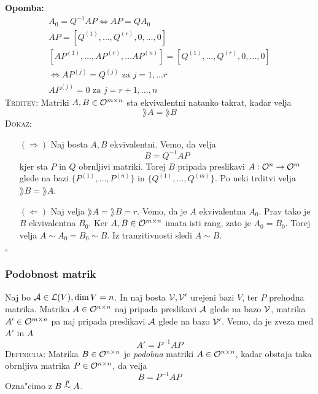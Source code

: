 \textbf{Opomba:} 
\begin{gather*}
A_0 = Q^{-1}AP \iff AP = Q A_0 \\
AP = [Q^{(1)}, \ldots, Q^{(r)}, 0, \ldots, 0] \\
[AP^{(1)}, \ldots, AP^{(r)}, \ldots AP^{(n)}] = [Q^{(1)}, \ldots, Q^{(r)}, 0, \ldots, 0] \\
\iff AP^{(j)} = Q^{(j)} \text{ za } j = 1, \ldots r \\
AP^{(j)} = 0 \text{ za } j = r+1, \ldots, n
\end{gather*}
%
\textsc{Trditev:} Matriki $A, B \in \mathcal{O}^{m \times n}$ sta ekvivalentni natanko takrat, kadar velja
\begin{equation*}
\rang A = \rang B
\end{equation*}
\textsc{Dokaz:}
\begin{itemize}
	\item[$(\Rightarrow)$] Naj bosta $A, B$ ekvivalentni. Vemo, da velja
	\begin{equation*}
	B = Q^{-1}AP
	\end{equation*}
	kjer sta $P$ in $Q$ obrnljivi matriki. Torej $B$ pripada preslikavi $A: \mathcal{O}^n \to \mathcal{O}^m$ glede na bazi $\{P^{(1)}, \ldots, P^{(n)}\}$ in $\{Q^{(1)}, \ldots, Q^{(m)}\}$. Po neki trditvi velja $\rang B = \rang A$.
	
	\item[$(\Leftarrow)$] Naj velja $\rang A = \rang B = r$. Vemo, da je $A$ ekvivalentna $A_0$. Prav tako je $B$ ekvivalentna $B_0$. Ker $A, B \in \mathcal{O}^{m \times n}$ imata isti rang, zato je $A_0 = B_0$. Torej velja $A \sim A_0 = B_0 \sim B$. Iz tranzitivnosti sledi $A \sim B$.
\end{itemize}
\hfill $\square$
%
\subsubsection{Podobnost matrik}
Naj bo $\mathcal{A} \in \mathcal{L}(V), \dim V = n$. In naj bosta $\mathcal{V}, \mathcal{V}'$ urejeni bazi $V$, ter $P$ prehodna matrika. Matrika $A \in \mathcal{O}^{n \times n}$ naj pripada preslikavi $\mathcal{A}$ glede na bazo $\mathcal{V}$, matrika $A' \in \mathcal{O}^{m \times n}$ pa naj pripada preslikavi $\mathcal{A}$ glede na bazo $\mathcal{V}'$. Vemo, da je zveza med $A'$ in $A$
\begin{equation*}
A' = P^{-1}AP
\end{equation*}
%
\textsc{Definicija:} Matrika $B \in \mathcal{O}^{n \times n}$ je \emph{podobna} matriki $A \in \mathcal{O}^{n \times n}$, kadar obstaja taka obrnljiva matrika $P \in \mathcal{O}^{n \times n}$, da velja
\begin{equation*}
B = P^{-1}AP
\end{equation*}
Ozna"cimo z $B \stackrel{p}{\sim} A$.

